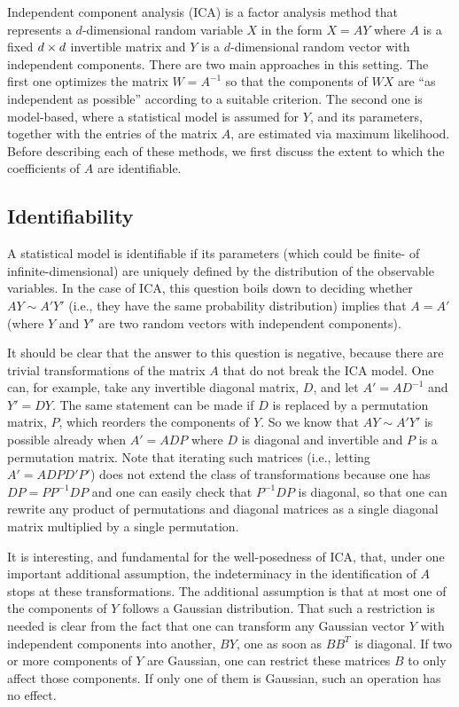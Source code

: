 Independent component analysis (ICA) is a factor analysis method that represents  a $d$-dimensional random variable $X$  in the form
$X = A Y$ where $A$ is a fixed $d\times d$ invertible matrix and
$Y$ is a $d$-dimensional random vector with independent components. 
There are two main approaches in this setting. The first one optimizes the matrix $W = A^{-1}$ so that  the components of $WX$ are ``as independent as possible'' according to a suitable criterion. The second one is  model-based, where a statistical model is assumed for $Y$, and its parameters, together with the entries of the matrix $A$, are estimated via maximum likelihood. Before describing each of these methods, we first discuss the extent to which the coefficients of $A$ are identifiable. 

\subsection{Identifiability}

A statistical model is identifiable if its parameters (which could be finite- of infinite-dimensional) are uniquely defined by the distribution of the observable variables. In the case of ICA, this question boils down to deciding whether $AY \sim A'Y'$ (i.e., they have the same probability distribution) implies that $A = A'$ (where $Y$ and $Y'$ are two random vectors with independent components).

It should be clear that the answer to this question is negative, because there are trivial transformations of the matrix $A$ that do not break the ICA model. One can, for example, take any invertible diagonal matrix, $D$, and let $A' = AD^{-1}$ and $Y' = DY$. The same statement can be made if $D$ is replaced by a permutation matrix, $P$, which reorders the components of $Y$. So we know that $AY \sim A'Y'$ is possible already when $A' = ADP$ where $D$ is diagonal and invertible and $P$ is a permutation matrix. Note that iterating such matrices (i.e., letting $A' = ADPD'P'$) does not extend the class of transformations because one  has $DP = PP^{-1}DP$ and one can easily check that  $P^{-1}DP$ is diagonal, so that one can rewrite any product of permutations and diagonal matrices as a single diagonal matrix multiplied by a single permutation. 

It is interesting, and fundamental for the well-posedness of ICA, that, under one  important additional assumption, the indeterminacy in the identification of $A$ stops at these transformations. The additional assumption is that at most one of the components of $Y$ follows a Gaussian distribution. That such a restriction is needed is clear from the fact that one can transform any Gaussian vector $Y$ with independent components into another, $BY$, one as soon as $BB^T$ is diagonal. If two or more components of $Y$ are Gaussian, one can restrict these matrices $B$ to only affect those components. If only one of them is Gaussian, such an operation has no effect. 

